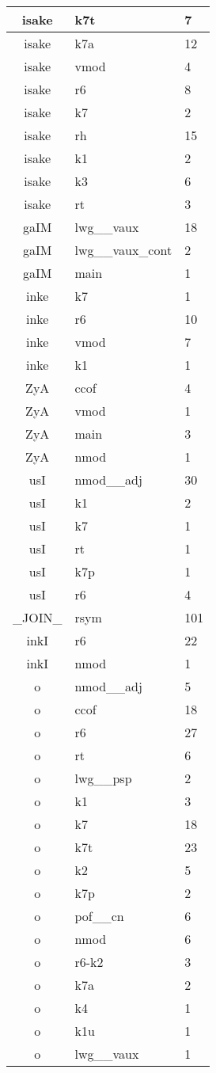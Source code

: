 \documentclass[a4 paper]{article}
\begin{document}
\begin{longtable}{cp{}p{}}
isake & k7t & 7\\ \midrule isake & k7a & 12\\ \midrule isake & vmod & 4\\ \midrule isake & r6 & 8\\ \midrule isake & k7 & 2\\ \midrule isake & rh & 15\\ \midrule isake & k1 & 2\\ \midrule isake & k3 & 6\\ \midrule isake & rt & 3\\ \midrule 
gaIM & lwg\_\_vaux & 18\\ \midrule gaIM & lwg\_\_vaux\_cont & 2\\ \midrule gaIM & main & 1\\ \midrule 
inke & k7 & 1\\ \midrule inke & r6 & 10\\ \midrule inke & vmod & 7\\ \midrule inke & k1 & 1\\ \midrule 
ZyA & ccof & 4\\ \midrule ZyA & vmod & 1\\ \midrule ZyA & main & 3\\ \midrule ZyA & nmod & 1\\ \midrule 
usI & nmod\_\_adj & 30\\ \midrule usI & k1 & 2\\ \midrule usI & k7 & 1\\ \midrule usI & rt & 1\\ \midrule usI & k7p & 1\\ \midrule usI & r6 & 4\\ \midrule 
\_JOIN\_ & rsym & 101\\ \midrule 
inkI & r6 & 22\\ \midrule inkI & nmod & 1\\ \midrule 
o & nmod\_\_adj & 5\\ \midrule o & ccof & 18\\ \midrule o & r6 & 27\\ \midrule o & rt & 6\\ \midrule o & lwg\_\_psp & 2\\ \midrule o & k1 & 3\\ \midrule o & k7 & 18\\ \midrule o & k7t & 23\\ \midrule o & k2 & 5\\ \midrule o & k7p & 2\\ \midrule o & pof\_\_cn & 6\\ \midrule o & nmod & 6\\ \midrule o & r6-k2 & 3\\ \midrule o & k7a & 2\\ \midrule o & k4 & 1\\ \midrule o & k1u & 1\\ \midrule o & lwg\_\_vaux & 1\\ \midrule 

\end{longtable}
\end{document}
